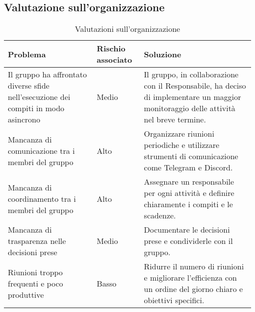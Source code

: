 \subsection{Valutazione sull'organizzazione}
\begin{table}[h!]
    \centering
    \begin{tabularx}{\textwidth}{|X|p{}|X|}\hline
    \rowcolor[HTML]{FFD700}
    \textbf{Problema} & \textbf{Rischio associato} & \textbf{Soluzione} \\ 
    \hline
    Il gruppo ha affrontato diverse sfide nell’esecuzione dei compiti in modo asincrono & Medio
    & Il gruppo, in collaborazione con il Responsabile, ha deciso di implementare un maggior monitoraggio delle
    attività nel breve termine. \\
    \hline
    Mancanza di comunicazione tra i membri del gruppo & Alto & 
    Organizzare riunioni periodiche e utilizzare strumenti di comunicazione come Telegram e Discord. \\ 
    \hline
    Mancanza di coordinamento tra i membri del gruppo & Alto & 
    Assegnare un responsabile per ogni attività e definire chiaramente i compiti e le scadenze. \\ 
    \hline
    Mancanza di trasparenza nelle decisioni prese & Medio & 
    Documentare le decisioni prese e condividerle con il gruppo. \\ 
    \hline
    Riunioni troppo frequenti e poco produttive & Basso & 
    Ridurre il numero di riunioni e migliorare l'efficienza con un ordine del giorno chiaro e obiettivi specifici. \\
    \hline
    \end{tabularx}
    \caption{Valutazioni sull'organizzazione}
    \label{tab:valutazioni_organizzazione}
\end{table}

